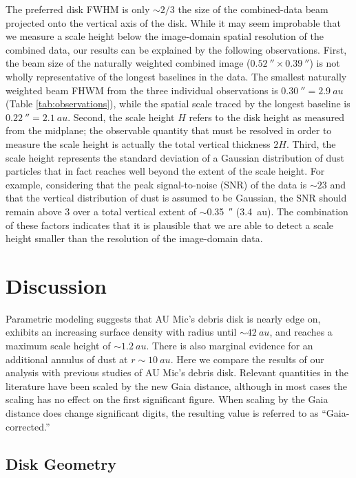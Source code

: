 \documentclass[modern]{aastex62}
\begin{document}
The preferred disk FWHM is only $\sim 2/3$ the size of the combined-data beam projected onto the vertical axis of the disk.
While it may seem improbable that we measure a scale height below the image-domain spatial resolution of the combined data, our results can be explained by the following observations.
First, the beam size of the naturally weighted combined image ($\SI{0.52}{\arcsecond} \times \SI{0.39}{\arcsecond}$) is not wholly representative of the longest baselines in the data. 
The smallest naturally weighted beam FHWM from the three individual observations is $\SI{0.30}{\arcsecond} = \SI{2.9}{au}$ (Table \ref{tab:observations}), while the spatial scale traced by the longest baseline is $\SI{0.22}{\arcsecond} = \SI{2.1}{au}$.
Second, the scale height $H$ refers to the disk height as measured from the midplane; the observable quantity that must be resolved in order to measure the scale height is actually the total vertical thickness $2H$.
Third, the scale height represents the standard deviation of a Gaussian distribution of dust particles that in fact reaches well beyond the extent of the scale height.
For example, considering that the peak signal-to-noise (SNR) of the data is $\sim 23$ and that the vertical distribution of dust is assumed to be Gaussian, the SNR should remain above 3 over a total vertical extent of $\sim$\SI{0.35}{\arcsecond} (\SI{3.4}{au}). 
The combination of these factors indicates that it is plausible that we are able to detect a scale height smaller than the resolution of the image-domain data.


\section{Discussion}
\label{section: discussion}

Parametric modeling suggests that AU Mic's debris disk is nearly edge on, exhibits an increasing surface density with radius until $\sim\SI{42}{au}$, and reaches a maximum scale height of $\sim\SI{1.2}{au}$.
There is also marginal evidence for an additional annulus of dust at $r \sim \SI{10}{au}$.
Here we compare the results of our analysis with previous studies of AU Mic's debris disk.
Relevant quantities in the literature have been scaled by the new Gaia distance, although in most cases the scaling has no effect on the first significant figure.
When scaling by the Gaia distance does change significant digits, the resulting value is referred to as ``Gaia-corrected.''

\subsection{Disk Geometry}
\label{subsection: disk geometry}
\end{document}
